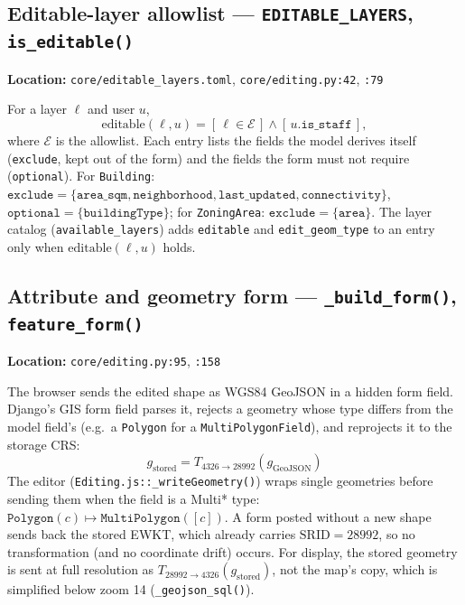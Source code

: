 \documentclass[11pt]{article}
\newcommand{\code}[1]{\texttt{#1}}
\begin{document}
\subsection{Editable-layer allowlist --- \code{EDITABLE\_LAYERS}, \code{is\_editable()}}
\textbf{Location:} \code{core/editable\_layers.toml}, \code{core/editing.py:42}, \code{:79}

For a layer $\ell$ and user $u$,
\begin{equation}
  \mathrm{editable}(\ell, u) = [\,\ell \in \mathcal{E}\,] \wedge [\,u.\texttt{is\_staff}\,],
\end{equation}
where $\mathcal{E}$ is the allowlist. Each entry lists the fields the model derives itself (\code{exclude}, kept out of the form) and the fields the form must not require (\code{optional}). For \code{Building}: $\texttt{exclude} = \{\texttt{area\_sqm}, \texttt{neighborhood}, \texttt{last\_updated}, \texttt{connectivity}\}$, $\texttt{optional} = \{\texttt{buildingType}\}$; for \code{ZoningArea}: $\texttt{exclude} = \{\texttt{area}\}$. The layer catalog (\code{available\_layers}) adds \code{editable} and \code{edit\_geom\_type} to an entry only when $\mathrm{editable}(\ell, u)$ holds.

\subsection{Attribute and geometry form --- \code{\_build\_form()}, \code{feature\_form()}}
\textbf{Location:} \code{core/editing.py:95}, \code{:158}

The browser sends the edited shape as WGS84 GeoJSON in a hidden form field. Django's GIS form field parses it, rejects a geometry whose type differs from the model field's (e.g.\ a \code{Polygon} for a \code{MultiPolygonField}), and reprojects it to the storage CRS:
\begin{equation}
  g_{\text{stored}} = T_{4326 \rightarrow 28992}\!\left(g_{\text{GeoJSON}}\right)
\end{equation}
The editor (\code{Editing.js::\_writeGeometry()}) wraps single geometries before sending them when the field is a Multi* type: $\texttt{Polygon}(c) \mapsto \texttt{MultiPolygon}([c])$. A form posted without a new shape sends back the stored EWKT, which already carries $\mathrm{SRID}=28992$, so no transformation (and no coordinate drift) occurs. For display, the stored geometry is sent at full resolution as $T_{28992 \rightarrow 4326}(g_{\text{stored}})$, not the map's copy, which is simplified below zoom 14 (\code{\_geojson\_sql()}).
\end{document}
